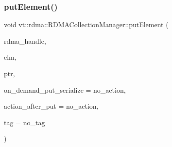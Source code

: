 \mbox{\label{structvt_1_1rdma_1_1_r_d_m_a_collection_manager_a0c39db9a1b61df2815a5bdcb9ab49bfa}} 
\subsubsection{\texorpdfstring{put\+Element()}{putElement()}}
{\footnotesize\ttfamily void vt\+::rdma\+::\+R\+D\+M\+A\+Collection\+Manager\+::put\+Element (\begin{DoxyParamCaption}\item[{\hyperlink{namespacevt_a10442579ec4e7ebef223818e64bcf908}{R\+D\+M\+A\+\_\+\+Handle\+Type} const \&}]{rdma\+\_\+handle,  }\item[{\hyperlink{namespacevt_a2c2a902092b72056f70210c159f966f0}{R\+D\+M\+A\+\_\+\+Elm\+Type} const \&}]{elm,  }\item[{\hyperlink{namespacevt_aab05b4a584f7ee835a6d0f66915cf59b}{R\+D\+M\+A\+\_\+\+Ptr\+Type} const \&}]{ptr,  }\item[{\hyperlink{namespacevt_abeb0129c92a5721f6f2c01b621f149fe}{R\+D\+M\+A\+\_\+\+Put\+Serialize}}]{on\+\_\+demand\+\_\+put\+\_\+serialize = {\ttfamily no\+\_\+action},  }\item[{\hyperlink{namespacevt_ae0a5a7b18cc99d7b732cb4d44f46b0f3}{Action\+Type}}]{action\+\_\+after\+\_\+put = {\ttfamily no\+\_\+action},  }\item[{\hyperlink{namespacevt_a84ab281dae04a52a4b243d6bf62d0e52}{Tag\+Type} const \&}]{tag = {\ttfamily no\+\_\+tag} }\end{DoxyParamCaption})\hspace{0.3cm}{\ttfamily [static]}}

\mbox{\label{structvt_1_1rdma_1_1_r_d_m_a_collection_manager_aada28534174a18a0cfc96de0b7d0d823}} 
